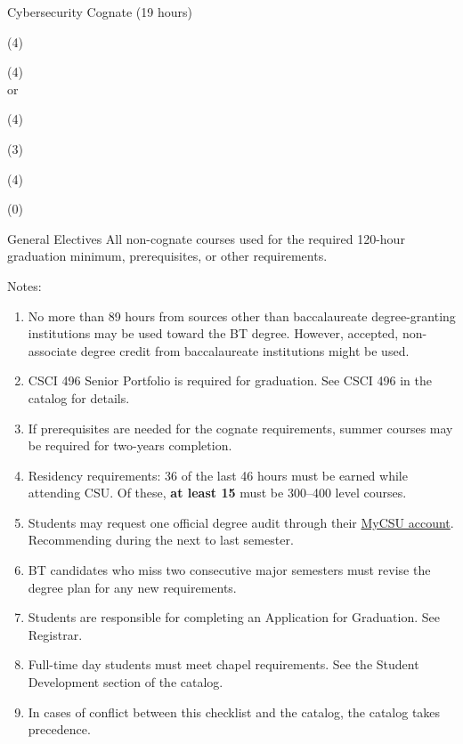 \begin{reqgroup}{Cybersecurity Cognate (19 hours)}%
\begin{checklist}%
\begin{minipage}[t]{0.5\linewidth}%
	\item (4) 
	\item (4) \\
		or 
	\item (4) 
\end{minipage}%
\begin{minipage}[t]{0.5\linewidth}
	\item (3) 
	\item (4) 
	\item (0) 
\end{minipage}
\end{checklist}
\end{reqgroup}

\begin{reqgroup}{General Electives}
All non-cognate courses used for the required 120-hour graduation minimum, prerequisites, or other requirements.
\end{reqgroup}

Notes:%
\begin{enumerate}\footnotesize
	\item No more than 89 hours from sources other than baccalaureate degree-granting institutions may be used toward the BT degree. However, accepted, non-associate degree credit from baccalaureate institutions might be used.
	\item CSCI 496 Senior Portfolio is required for graduation. See CSCI 496 in the catalog for details.
	\item If prerequisites are needed for the cognate requirements, summer courses may be required for two-years completion.
	\item Residency requirements: 36 of the last 46 hours must be earned while attending CSU\@. Of these, \textbf{at least 15} must be 300--400 level courses.
	\item Students may request one official degree audit through their \href{https://portal.csuniv.edu/}{MyCSU account}. Recommending during the next to last semester.
	\item BT candidates who miss two consecutive major semesters must revise the degree plan for any new requirements.
	\item Students are responsible for completing an Application for Graduation. See Registrar.
	\item Full-time day students must meet chapel requirements. See the Student Development section of the catalog.
	\item In cases of conflict between this checklist and the catalog, the catalog takes precedence.
\end{enumerate}